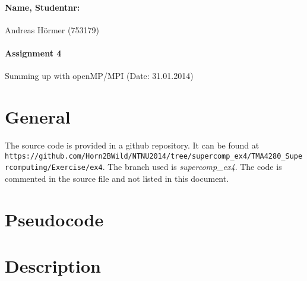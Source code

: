\documentclass{article}
\begin{document}
\paragraph{Name, Studentnr: }Andreas H\"ormer (753179)
\paragraph{Assignment 4}Summing up with openMP/MPI (Date: 31.01.2014)

	\section{General}
		The source code is provided in a github repository. It can be found at\\
		\small{\texttt{https://github.com/Horn2BWild/NTNU2014/tree/supercomp\_ex4/TMA4280\_Supercomputing/Exercise/ex4}. The branch used is \textit{supercomp\_ex4}}. The code is commented in the source file and not listed in this document.
	\section{Pseudocode}
	\section{Description}
\end{document}
